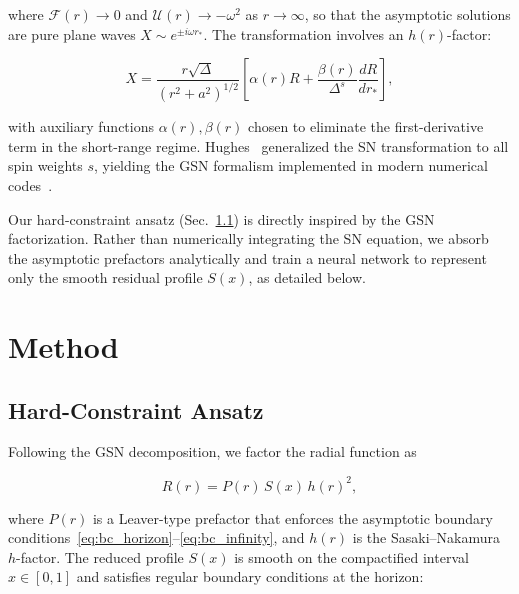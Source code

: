\documentclass[aps,prd,twocolumn,superscriptaddress,nofootinbib]{revtex4-2}
\begin{document}
where $\mathcal{F}(r) \to 0$ and $\mathcal{U}(r) \to -\omega^2$ as
$r \to \infty$, so that the asymptotic solutions are pure plane waves
$X \sim e^{\pm i\omega r_*}$.  The transformation involves an $h(r)$-factor:

\begin{equation}
  X = \frac{r\sqrt{\Delta}}{(r^2 + a^2)^{1/2}}
    \left[ \alpha(r) R + \frac{\beta(r)}{\Delta^s} \frac{dR}{dr_*} \right],
  \label{eq:SN_transform}
\end{equation}

with auxiliary functions $\alpha(r), \beta(r)$ chosen to eliminate the
first-derivative term in the short-range regime.  Hughes~\cite{Hughes:2000jr}
generalized the SN transformation to all spin weights $s$, yielding the GSN
formalism implemented in modern numerical codes~\cite{Rico:2023gwl}.

Our hard-constraint ansatz (Sec.~\ref{sec:ansatz}) is directly inspired by the
GSN factorization.  Rather than numerically integrating the SN equation, we
absorb the asymptotic prefactors analytically and train a neural network to
represent only the smooth residual profile $S(x)$, as detailed below.

\section{Method}
\label{sec:method}

\subsection{Hard-Constraint Ansatz}
\label{sec:ansatz}

Following the GSN decomposition, we factor the radial function as

\begin{equation}\label{eq:R_factor}
  R(r) = P(r)\, S(x)\, h(r)^2,
\end{equation}

where $P(r)$ is a Leaver-type prefactor that enforces the asymptotic boundary
conditions~\eqref{eq:bc_horizon}--\eqref{eq:bc_infinity}, and $h(r)$ is the
Sasaki--Nakamura $h$-factor.  The reduced profile $S(x)$ is smooth on the
compactified interval $x \in [0, 1]$ and satisfies regular boundary conditions
at the horizon:
\end{document}

